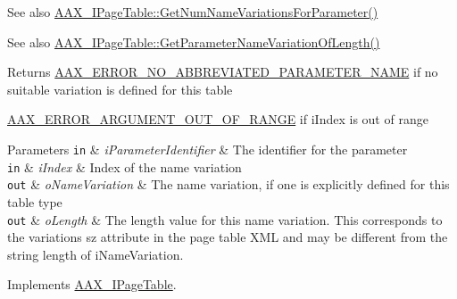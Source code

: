 \begin{DoxyItemize}
\item \begin{DoxySeeAlso}{See also}
\hyperlink{a00107_af8be797a3ec7ed3117e720dd29ea7cc7}{A\+A\+X\+\_\+\+I\+Page\+Table\+::\+Get\+Num\+Name\+Variations\+For\+Parameter()}
\end{DoxySeeAlso}

\item \begin{DoxySeeAlso}{See also}
\hyperlink{a00107_a6ddd61f6ba18b8be8141363d5234ed9d}{A\+A\+X\+\_\+\+I\+Page\+Table\+::\+Get\+Parameter\+Name\+Variation\+Of\+Length()}
\end{DoxySeeAlso}
\begin{DoxyReturn}{Returns}
\hyperlink{a00207_a5f8c7439f3a706c4f8315a9609811937ab7383b0169f6dfa5f86b1fefd6c58ae2}{A\+A\+X\+\_\+\+E\+R\+R\+O\+R\+\_\+\+N\+O\+\_\+\+A\+B\+B\+R\+E\+V\+I\+A\+T\+E\+D\+\_\+\+P\+A\+R\+A\+M\+E\+T\+E\+R\+\_\+\+N\+A\+M\+E} if no suitable variation is defined for this table

\hyperlink{a00207_a5f8c7439f3a706c4f8315a9609811937a8dd2fdd469583a046765eae9178678a3}{A\+A\+X\+\_\+\+E\+R\+R\+O\+R\+\_\+\+A\+R\+G\+U\+M\+E\+N\+T\+\_\+\+O\+U\+T\+\_\+\+O\+F\+\_\+\+R\+A\+N\+G\+E} if {\ttfamily i\+Index} is out of range
\end{DoxyReturn}

\begin{DoxyParams}[1]{Parameters}
\mbox{\tt in}  & {\em i\+Parameter\+Identifier} & The identifier for the parameter \\
\hline
\mbox{\tt in}  & {\em i\+Index} & Index of the name variation \\
\hline
\mbox{\tt out}  & {\em o\+Name\+Variation} & The name variation, if one is explicitly defined for this table type \\
\hline
\mbox{\tt out}  & {\em o\+Length} & The length value for this name variation. This corresponds to the variation\textquotesingle{}s {\ttfamily sz} attribute in the page table X\+M\+L and may be different from the string length of {\ttfamily i\+Name\+Variation}. \\
\hline
\end{DoxyParams}

\end{DoxyItemize}

Implements \hyperlink{a00107_adffe5a5f2ad548bd4c704508d816d568}{A\+A\+X\+\_\+\+I\+Page\+Table}.

\hypertarget{a00138_af6e05bfc749add76b4b0c98bb689e953}{}
